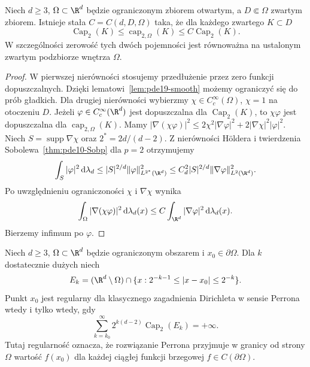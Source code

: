 \begin{lemat}
\label{lem:pde19-cap-comparison}
Niech $d\ge3$, $\Omega\subset\R^d$ będzie ograniczonym
zbiorem otwartym, a $D\Subset\Omega$ zwartym zbiorem.
Istnieje stała $C=C(d,D,\Omega)$ taka, że dla każdego
zwartego $K\subset D$
\[
 \operatorname{Cap}_2(K)\le\operatorname{cap}_{2,\Omega}(K)
 \le C\operatorname{Cap}_2(K).
\]
W szczególności zerowość tych dwóch pojemności jest
równoważna na ustalonym zwartym podzbiorze wnętrza $\Omega$.
\end{lemat}
\begin{proof}
W pierwszej nierówności stosujemy przedłużenie przez
zero funkcji dopuszczalnych. Dzięki
lematowi~\ref{lem:pde19-smooth} możemy ograniczyć się
do prób gładkich. Dla drugiej nierówności wybierzmy
$\chi\in C_c^\infty(\Omega)$, $\chi=1$ na otoczeniu $D$.
Jeżeli $\varphi\in C_c^\infty(\R^d)$ jest dopuszczalna
dla $\operatorname{Cap}_2(K)$, to $\chi\varphi$ jest
dopuszczalna dla $\operatorname{cap}_{2,\Omega}(K)$.
Mamy $|\nabla(\chi\varphi)|^2\le
2\chi^2|\nabla\varphi|^2+2|\nabla\chi|^2|\varphi|^2$.
Niech $S=\operatorname{supp}\nabla\chi$ oraz
$2^*=2d/(d-2)$. Z nierówności Höldera
i twierdzenia Sobolewa~\ref{thm:pde10-Sobp} dla $p=2$
otrzymujemy
\[
 \int_S|\varphi|^2\,\mathrm d\lambda_d
 \le |S|^{2/d}\|\varphi\|_{L^{2^*}(\R^d)}^2
 \le C_d^2|S|^{2/d}\|\nabla\varphi\|_{L^2(\R^d)}^2.
\]
Po uwzględnieniu ograniczoności $\chi$ i $\nabla\chi$
wynika
\[
 \int_\Omega|\nabla(\chi\varphi)|^2
 \,\mathrm d\lambda_d(x)
 \le C\int_{\R^d}|\nabla\varphi|^2
 \,\mathrm d\lambda_d(x).
\]
Bierzemy infimum po $\varphi$.
\end{proof}

\begin{twierdzenie}
\label{thm:pde19-wiener}
Niech $d\ge3$, $\Omega\subset\R^d$ będzie ograniczonym
obszarem i $x_0\in\partial\Omega$. Dla $k$ dostatecznie
dużych niech
\[
 E_k=(\R^d\setminus\Omega)\cap
 \{x:2^{-k-1}\le|x-x_0|\le2^{-k}\}.
\]
Punkt $x_0$ jest regularny dla klasycznego zagadnienia
Dirichleta w sensie Perrona wtedy i tylko wtedy, gdy
\begin{equation}\label{eq:pde19-wiener}
 \sum_{k=k_0}^\infty
 2^{k(d-2)}\operatorname{Cap}_2(E_k)=+\infty.
\end{equation}
Tutaj regularność oznacza, że rozwiązanie Perrona
przyjmuje w granicy od strony $\Omega$ wartość
$f(x_0)$ dla każdej ciągłej funkcji brzegowej
$f\in C(\partial\Omega)$.
\end{twierdzenie}

